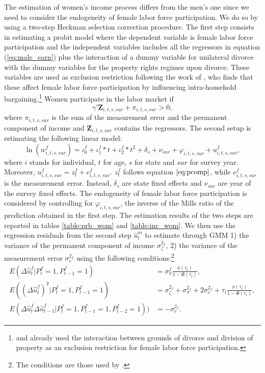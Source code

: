 \documentclass[12pt]{article}
\numberwithin{table}{section}
\begin{document}
The estimation of women's income process differs from the men's one since we need to consider the endogeneity of female labor force participation. We do so by using a two-step Heckman selection correction procedure. The first step consists in estimating a probit model where the dependent variable is female labor force participation and the independent variables includes all the regressors in equation (\ref{eq:male_earn}) plus the interaction of a dummy variable for unilateral divorce with the dummy variables for the property rights regimes upon divorce. These variables are used as exclusion restriction following the work of \cite{voena2015}, who finds that these affect female labor force participation by influencing intra-household bargaining.\footnote{\cite{voena2015} and \cite{reynoso2019} already used the interaction between grounds of divorce and division of property as an exclusion restriction for female labor force participation.} Women participate in the labor market if
\begin{equation}\label{eq:femae_part}
\gamma'\mathbf{Z}_{i,t,s,sur}+\pi_{i,t,s,sur}>0,
\end{equation}
where $\pi_{i,t,s,sur}$ is the sum of the measurement error and the permanent component of income and $\mathbf{Z}_{i,t,s,sur}$ contains the regressors. The second setup is estimating the following linear model:
\begin{equation}\label{eq:femae_earn}
\ln(w^f_{i,t,s,sur})=\iota^f_0+\iota^f_1*t+\iota^f_2*t^2+\delta_s+\nu_{sur}+\varphi_{i,t,s,sur}+u_{i,t,s,sur}^f,
\end{equation}
where $i$ stands for individual, $t$ for age, $s$ for state and $sur$ for survey year. Moreover, $u_{i,t,s,sur}^f=z_t^f+e^f_{i,t,s,sur}$. $z_t^f$ follows equation $\ref{eq:pcomp}$, while $e^f_{i,t,s,sur}$ is the measurement error. Instead, $\delta_s$ are state fixed effects and $\nu_{sur}$ are year of the survey fixed effects. The endogeneity of female labor force participation is considered by controlling for $\varphi_{i,t,s,sur}$, the inverse of the Mills ratio of the prediction obtained in the first step. The estimation results of the two steps are reported in tables \ref{table:prb_wom} and \ref{table:inc_wom}. We then use the regression residuals from the second step $\hat{u}_{t}^m$  to estimate through GMM 1) the variance of the permanent component of income $\sigma_\zeta^{2_f}$, 2) the variance of the measurement error $\sigma_e^{2_f}$ using the following conditions:\footnote{The conditions are those used by \cite{low2018}.}
\begin{equation}\label{eq:female_gmm}
\begin{split}
E(\Delta\hat{u}_{t}^f | P^f_t=1,P^f_{t-1}=1)&=\sigma_\pi^{f}\frac{\phi(\tau_t)}{1-\Phi(\tau_t)},\\
E((\Delta\hat{u}_{t}^{f})^2 | P^f_t=1,P^f_{t-1}=1)&=\sigma_\zeta^{2_f}+\sigma_\pi^{2_f}+2\sigma_e^{2_f}+\tau_t\frac{\phi(\tau_t)}{1-\Phi(\tau_t)},\\
E(\Delta\hat{u}_{t}^f\Delta\hat{u}_{t-1}^f | P^f_t=1,P^f_{t-1}=1,P^f_{t-2}=1))&=-\sigma_e^{2_f}.
\end{split}
\end{equation}
\end{document}
